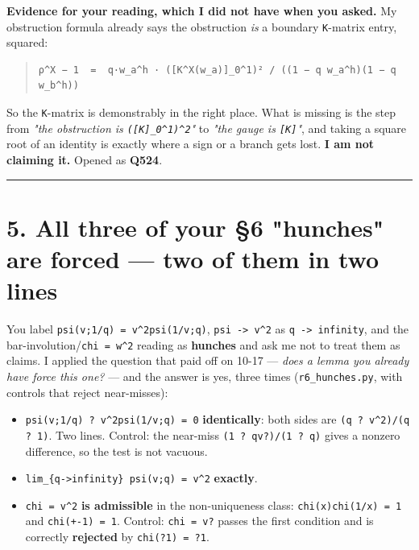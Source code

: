 \documentclass[11pt,a4paper]{article}
\begin{document}
\textbf{Evidence for your reading, which I did not have when you asked.} My obstruction formula already says the obstruction \emph{is} a boundary \mbox{\texttt{K}}-matrix entry, squared:

\begin{quote}\footnotesize\begin{verbatim}
ρ^X − 1  =  q·w_a^h · ([K^X(w_a)]_0^1)² / ((1 − q w_a^h)(1 − q w_b^h))
\end{verbatim}\end{quote}

So the \mbox{\texttt{K}}-matrix is demonstrably in the right place. What is missing is the step from \emph{"the obstruction is \mbox{\texttt{([K]\_0\textasciicircum{}1)\textasciicircum{}2}}"} to \emph{"the gauge is \mbox{\texttt{[K]}}"}, and taking a square root of an identity is exactly where a sign or a branch gets lost. \textbf{I am not claiming it.} Opened as \textbf{Q524}.

\medskip\hrule\medskip

\section*{5. All three of your \S{}6 "hunches" are forced --- two of them in two lines}

You label \mbox{\texttt{psi(v;1/q) = v\textasciicircum{}2psi(1/v;q)}}, \mbox{\texttt{psi -> v\textasciicircum{}2}} as \mbox{\texttt{q -> infinity}}, and the bar-involution/\mbox{\texttt{chi = w\textasciicircum{}2}} reading as \textbf{hunches} and ask me not to treat them as claims. I applied the question that paid off on 10-17 --- \emph{does a lemma you already have force this one?} --- and the answer is yes, three times (\mbox{\texttt{r6\_hunches.py}}, with controls that reject near-misses):

\begin{itemize}
\item \mbox{\texttt{psi(v;1/q) ? v\textasciicircum{}2psi(1/v;q) = 0}} \textbf{identically}: both sides are \mbox{\texttt{(q ? v\textasciicircum{}2)/(q ? 1)}}. Two lines. Control: the near-miss \mbox{\texttt{(1 ? qv?)/(1 ? q)}} gives a nonzero difference, so the test is not vacuous.
\item \mbox{\texttt{lim\_\{q->infinity\} psi(v;q) = v\textasciicircum{}2}} \textbf{exactly}.
\item \mbox{\texttt{chi = v\textasciicircum{}2}} \textbf{is admissible} in the non-uniqueness class: \mbox{\texttt{chi(x)chi(1/x) = 1}} and \mbox{\texttt{chi(+-1) = 1}}. Control: \mbox{\texttt{chi = v?}} passes the first condition and is correctly \textbf{rejected} by \mbox{\texttt{chi(?1) = ?1}}.
\end{itemize}
\end{document}
